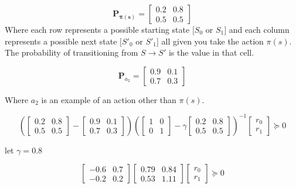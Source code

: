 \documentclass{article}
\begin{document}
    $$
    \mathbf{P_{\pi(s)}} = \begin{bmatrix}
        0.2 & 0.8 \\
        0.5 & 0.5 
    \end{bmatrix}
    $$
    Where each row represents a possible starting state $[S_0 $ or $ S_1]$ and each column represents a possible next state $[S'_0 $ or $ S'_1]$ all given you take the action $\pi(s)$. The probability of transitioning from $S \to S'$ is the value in that cell.

    $$
    \mathbf{P}_{a_2} = \begin{bmatrix}
        0.9 & 0.1 \\
        0.7 & 0.3 
    \end{bmatrix}
    $$

    Where $a_2$ is an example of an action other than $\pi(s)$.

    $$
    \left (
    \begin{bmatrix}
        0.2 & 0.8 \\
        0.5 & 0.5 
    \end{bmatrix}
        -
    \begin{bmatrix}
        0.9 & 0.1 \\
        0.7 & 0.3 
    \end{bmatrix}
    \right ) 
    \left (
        \begin{bmatrix}
            1 & 0 \\
            0 & 1 
        \end{bmatrix}
        -
        \gamma
        \begin{bmatrix}
            0.2 & 0.8 \\
            0.5 & 0.5 
        \end{bmatrix}
    \right )^{-1}
    \begin{bmatrix}
        r_0 \\
        r_1 
    \end{bmatrix} \succeq 0 
    $$
    \begin{center}
        let $\gamma = 0.8$ 
    \end{center} 
    $$
    \begin{bmatrix}
        -0.6 & 0.7 \\
        -0.2 & 0.2 
    \end{bmatrix} 
        \begin{bmatrix}
            0.79 & 0.84 \\
            0.53 & 1.11 
        \end{bmatrix}
    \begin{bmatrix}
        r_0 \\
        r_1 
    \end{bmatrix} \succeq 0 
    $$
    
\end{document}
